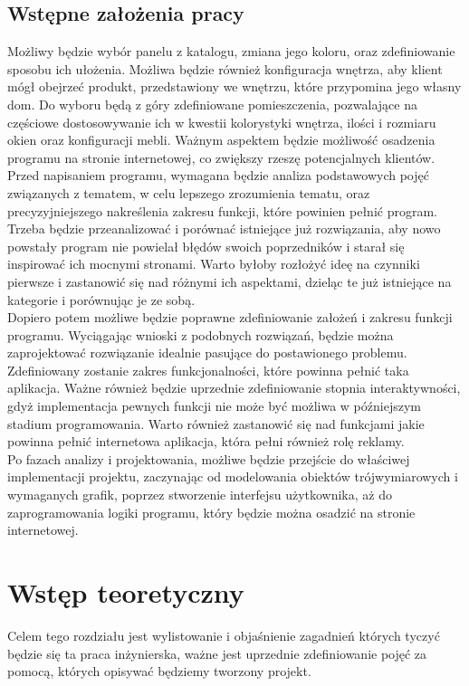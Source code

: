 \documentclass{article} %
\begin{document}
\subsection{Wstępne założenia pracy}
Możliwy będzie wybór panelu z katalogu, zmiana jego koloru, oraz zdefiniowanie sposobu ich ułożenia. Możliwa będzie również konfiguracja wnętrza, aby klient mógł obejrzeć produkt, przedstawiony we wnętrzu, które przypomina jego własny dom. Do wyboru będą z góry zdefiniowane pomieszczenia, pozwalające na częściowe dostosowywanie ich w kwestii kolorystyki wnętrza, ilości i rozmiaru okien oraz konfiguracji mebli. Ważnym aspektem będzie możliwość osadzenia programu na stronie internetowej, co zwiększy rzeszę potencjalnych klientów.
\\

Przed napisaniem programu, wymagana będzie analiza podstawowych pojęć związanych z tematem, w celu lepszego zrozumienia tematu, oraz precyzyjniejszego nakreślenia zakresu funkcji, które powinien pełnić program. Trzeba będzie przeanalizować i porównać istniejące już rozwiązania, aby nowo powstały program nie powielał błędów swoich poprzedników i starał się inspirować ich mocnymi stronami. Warto byłoby rozłożyć ideę na czynniki pierwsze i zastanowić się nad różnymi ich aspektami, dzieląc te już istniejące na kategorie i porównując je ze sobą.
\\

Dopiero potem możliwe będzie poprawne zdefiniowanie założeń i zakresu funkcji programu. Wyciągając wnioski z podobnych rozwiązań, będzie można zaprojektować rozwiązanie idealnie pasujące do postawionego problemu. Zdefiniowany zostanie zakres funkcjonalności, które powinna pełnić taka aplikacja. Ważne również będzie uprzednie zdefiniowanie stopnia interaktywności, gdyż implementacja pewnych funkcji nie może być możliwa w późniejszym stadium programowania. Warto również zastanowić się nad funkcjami jakie powinna pełnić internetowa aplikacja, która pełni również rolę reklamy.
\\

Po fazach analizy i projektowania, możliwe będzie przejście do właściwej implementacji projektu, zaczynając od modelowania obiektów trójwymiarowych i wymaganych grafik, poprzez stworzenie interfejsu użytkownika, aż do  zaprogramowania logiki programu, który będzie można osadzić na stronie internetowej.
\\

\newpage

\section{Wstęp teoretyczny}
    Celem tego rozdziału jest wylistowanie i objaśnienie zagadnień których tyczyć będzie się ta praca inżynierska, ważne jest uprzednie zdefiniowanie pojęć za pomocą, których opisywać będziemy tworzony projekt.
    \\
   
\end{document}
